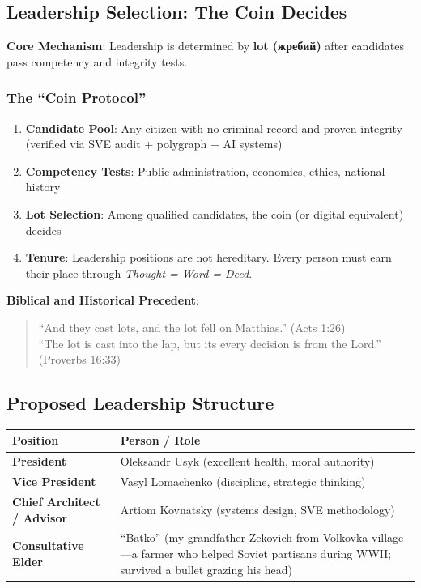 \documentclass[11pt,a4paper]{article}
\theoremstyle{definition}
\theoremstyle{remark}
\begin{document}
\subsection{Leadership Selection: The Coin Decides}

\textbf{Core Mechanism}: Leadership is determined by \textbf{lot (жребий)} after candidates pass competency and integrity tests.

\subsubsection{The ``Coin Protocol''}

\begin{enumerate}
\item \textbf{Candidate Pool}: Any citizen with no criminal record and proven integrity (verified via SVE audit + polygraph + AI systems)
\item \textbf{Competency Tests}: Public administration, economics, ethics, national history
\item \textbf{Lot Selection}: Among qualified candidates, the coin (or digital equivalent) decides
\item \textbf{Tenure}: Leadership positions are not hereditary. Every person must earn their place through \textit{Thought = Word = Deed}.
\end{enumerate}

\textbf{Biblical and Historical Precedent}:
\begin{quote}
``And they cast lots, and the lot fell on Matthias.'' (Acts 1:26) \\
``The lot is cast into the lap, but its every decision is from the Lord.'' (Proverbs 16:33)
\end{quote}

\subsection{Proposed Leadership Structure}

\begin{center}
\begin{tabular}{|l|p{8cm}|}
\hline
\textbf{Position} & \textbf{Person / Role} \\ \hline
\textbf{President} & Oleksandr Usyk (excellent health, moral authority) \\
\textbf{Vice President} & Vasyl Lomachenko (discipline, strategic thinking) \\
\textbf{Chief Architect / Advisor} & Artiom Kovnatsky (systems design, SVE methodology) \\
\textbf{Consultative Elder} & ``Batko'' (my grandfather Zekovich from Volkovka village—a farmer who helped Soviet partisans during WWII; survived a bullet grazing his head) \\ \hline
\end{tabular}
\end{center}
\end{document}
